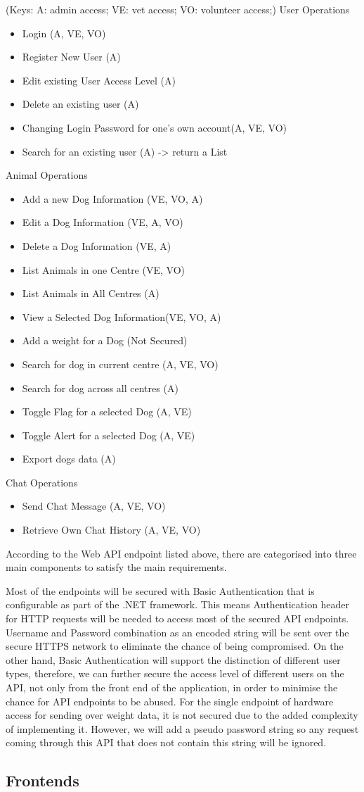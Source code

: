 (Keys: A: admin access; VE: vet access; VO: volunteer access;)
User Operations
\begin{itemize}
  \item Login (A, VE, VO)
  \item Register New User (A)
  \item Edit existing User Access Level (A)
  \item Delete an existing user (A)
  \item Changing Login Password for one's own account(A, VE, VO)
  \item Search for an existing user (A) -> return a List
 \end{itemize}
 Animal Operations
 \begin{itemize}
  \item Add a new Dog Information (VE, VO, A)
  \item Edit a Dog Information (VE, A, VO)
  \item Delete a Dog Information (VE, A)
  \item List Animals in one Centre (VE, VO)
  \item List Animals in All Centres (A)
  \item View a Selected Dog Information(VE, VO, A)
  \item Add a weight for a Dog (Not Secured)
  \item Search for dog in current centre (A, VE, VO)
  \item Search for dog across all centres (A) 
  \item Toggle Flag for a selected Dog (A, VE)
  \item Toggle Alert for a selected Dog (A, VE)
  \item Export dogs data (A)
 \end{itemize}
 Chat Operations
 \begin{itemize}
  \item Send Chat Message (A, VE, VO)
  \item Retrieve Own Chat History (A, VE, VO) 
 \end{itemize}

According to the Web API endpoint listed above, there are categorised into three main components to satisfy the main requirements.

Most of the endpoints will be secured with Basic Authentication that is configurable as part of the .NET framework. This means Authentication header for HTTP requests will be needed to access most of the secured API endpoints. Username and Password combination as an encoded string will be sent over the secure HTTPS network to eliminate the chance of being compromised. On the other hand, Basic Authentication will support the distinction of different user types, therefore, we can further secure the access level of different users on the API, not only from the front end of the application, in order to minimise the chance for API endpoints to be abused. For the single endpoint of hardware access for sending over weight data, it is not secured due to the added complexity of implementing it. However, we will add a pseudo password string so any request coming through this API that does not contain this string will be ignored.




\subsection{Frontends}
